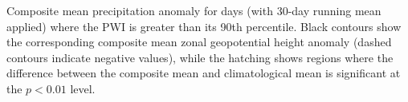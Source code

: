 \label{fig:pr_composite}
Composite mean precipitation anomaly for days (with 30-day running mean applied) where the PWI is greater than its 90th percentile. Black contours show the corresponding composite mean zonal geopotential height anomaly (dashed contours indicate negative values), while the hatching shows regions where the difference between the composite mean and climatological mean is significant at the $p < 0.01$ level.